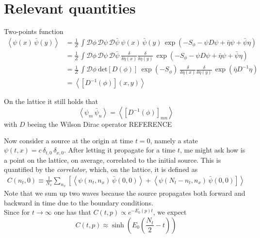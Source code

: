 \section{Relevant quantities}
Two-points function
\begin{align*}
    \left\langle \psi(x) \, \bar\psi(y) \right\rangle 
    &= \frac{1}{Z} \, \int \mathcal{D}\phi \, \mathcal{D}\psi \, \mathcal{D}\bar\psi \ \psi(x) \, \bar\psi(y) \, \exp \left( - S_\phi - \psi D \psi + \bar\eta \psi + \bar \psi \eta \right) \\
    &= \frac{1}{Z} \, \int \mathcal{D}\phi \, \mathcal{D}\psi \, \mathcal{D}\bar\psi \ \frac{\delta}{\delta \bar \eta(x)} \frac{\delta}{\delta \eta(y)} \, \exp \left( - S_\phi - \psi D \psi + \bar\eta \psi + \bar \psi \eta \right) \\
    &= \frac{1}{Z} \, \int \mathcal{D}\phi \ \text{det}\left[D(\phi)\right] \ \exp \left( - S_\phi \right) \ \frac{\delta}{\delta \bar \eta(x)} \frac{\delta}{\delta \eta(y)} \, \exp\left( \bar\eta D^{-1} \eta \right) \\
    &= \left\langle \left[D^{-1}(\phi)\right](x,y)\right\rangle
\end{align*}

On the lattice it still holds that 
\begin{equation*}
     \left\langle \psi_m \, \bar\psi_n \right\rangle =     \left\langle \left[D^{-1}(\phi)\right]_{mn}\right\rangle
\end{equation*}
with $D$ beeing the Wilson Dirac operator REFERENCE

Now consider a source at the origin at time $t=0$, namely a state $\psi(t,x) = c \, \delta_{t,0} \, \delta_{x,0}$. After letting it propagate for a time $t$, me might ask how is a point on the lattice, on average, correlated to the initial source. This is quantified by the \emph{correlator}, which, on the lattice, it is defined as
\begin{align*}
    C(n_t,0) \equiv \frac{1}{N_x} \sum_{n_x} \left[\left\langle \psi(n_t, n_x) \, \bar\psi(0,0)\right\rangle + \left\langle \psi(N_t-n_t, n_x) \, \bar\psi(0,0) \right] \right\rangle
\end{align*}
Note that we sum up two waves because the source propagates both forward and backward in time due to the boundary conditions. \\
Since for $t \to \infty$ one has that $C(t,p) \propto e^{-E_0(p) t}$, we expect 
\begin{equation*}
    C(t,p) \approx \sinh \left(E_0 \left(\frac{N_t}{2} - t\right)\right)
\end{equation*}

